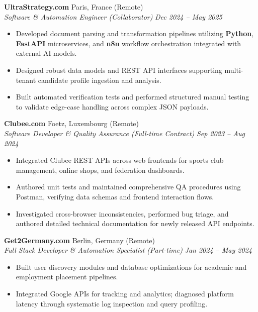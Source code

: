 \documentclass[10pt,a4paper]{article}
\begin{document}
\vspace{3pt}

\textbf{UltraStrategy.com} \hfill Paris, France (Remote) \\
\textit{Software \& Automation Engineer (Collaborator)} \hfill \textit{Dec 2024 -- May 2025}
\begin{itemize}
    \item Developed document parsing and transformation pipelines utilizing \textbf{Python}, \textbf{FastAPI} microservices, and \textbf{n8n} workflow orchestration integrated with external AI models.
    \item Designed robust data models and REST API interfaces supporting multi-tenant candidate profile ingestion and analysis.
    \item Built automated verification tests and performed structured manual testing to validate edge-case handling across complex JSON payloads.
\end{itemize}

\vspace{3pt}

\textbf{Clubee.com} \hfill Foetz, Luxembourg (Remote) \\
\textit{Software Developer \& Quality Assurance (Full-time Contract)} \hfill \textit{Sep 2023 -- Aug 2024}
\begin{itemize}
    \item Integrated Clubee REST APIs across web frontends for sports club management, online shops, and federation dashboards.
    \item Authored unit tests and maintained comprehensive QA procedures using Postman, verifying data schemas and frontend interaction flows.
    \item Investigated cross-browser inconsistencies, performed bug triage, and authored detailed technical documentation for newly released API endpoints.
\end{itemize}

\vspace{3pt}

\textbf{Get2Germany.com} \hfill Berlin, Germany (Remote) \\
\textit{Full Stack Developer \& Automation Specialist (Part-time)} \hfill \textit{Jan 2024 -- May 2024}
\begin{itemize}
    \item Built user discovery modules and database optimizations for academic and employment placement pipelines.
    \item Integrated Google APIs for tracking and analytics; diagnosed platform latency through systematic log inspection and query profiling.
\end{itemize}
\end{document}
